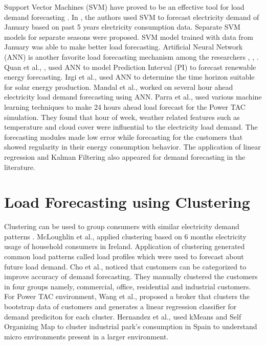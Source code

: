 Support Vector Machines (SVM) have proved to be an effective tool for load demand forecasting \cite{sapankevych2009time, chen2004load}. In \cite{chen2004load}, the authors used SVM to forecast electricity demand of January based on past 5 years electricity consumption data. Separate SVM models for separate seasons were proposed. SVM model trained with data from January was able to make better load forecasting. Artificial Neural Network (ANN) is another favorite load forecasting mechanism among the researchers \cite{izgi2012short}, \cite{quan2014short}, \cite{hsu2003regional}. Quan et al., \cite{quan2014short}, used ANN to model Prediction Interval (PI) to forecast renewable energy forecasting. Izgi et al.,  \cite{izgi2012short} used ANN to determine the time horizon suitable for solar energy production. Mandal et al., \cite{mandal2006neural} worked on several hour ahead electricity load demand forecasting using ANN. Parra \cite{parra2013initial} et al., used various machine learning techniques to make 24 hours ahead load forecast for the Power TAC simulation. They found that hour of week, weather related features such as temperature and cloud cover were influential to the electricity load demand. The forecasting modules made low error while forecasting for the customers that showed regularity in their energy consumption behavior. The application of linear regression \cite{mcloughlin2015clustering, hernandez2012classification} and Kalman Filtering \cite{al2004short} also appeared for demand forecasting in the literature. 

\section {Load Forecasting using Clustering}

Clustering can be used to group consumers with similar electricity demand patterns \cite{hernandez2012classification}. McLoughlin et al., \cite{mcloughlin2015clustering} applied clustering based on 6 months electricity usage of household consumers in Ireland. Application of clustering generated common load patterns called load profiles which were used to forecast about future load demand. Cho \cite{cho1995customer} et al., noticed that customers can be categorized to improve accuracy of demand forecasting. They manually clustered the customers in four groups namely, commercial, office, residential and industrial customers. For Power TAC environment, Wang et al., \cite{wang2015gongbroker} proposed a broker that clusters the bootstrap data of customers and generates a linear regression classifier for demand prediciton for each cluster.  Hernandez et al., \cite{hernandez2012classification} used kMeans and Self Organizing Map to cluster industrial park's consumption in Spain to understand micro environments present in a larger environment.


